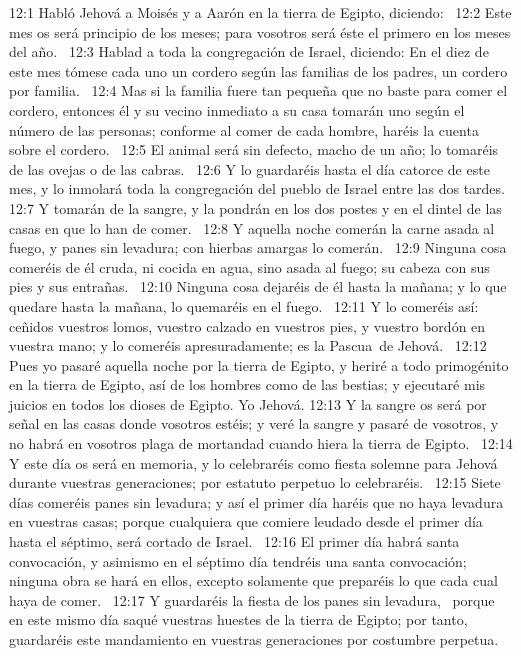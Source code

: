 12:1 Habló Jehová a Moisés y a Aarón en la tierra de Egipto, diciendo:  
12:2 Este mes os será principio de los meses; para vosotros será éste el primero en los meses del año.  
12:3 Hablad a toda la congregación de Israel, diciendo: En el diez de este mes tómese cada uno un cordero según las familias de los padres, un cordero por familia.  
12:4 Mas si la familia fuere tan pequeña que no baste para comer el cordero, entonces él y su vecino inmediato a su casa tomarán uno según el número de las personas; conforme al comer de cada hombre, haréis la cuenta sobre el cordero.  
12:5 El animal será sin defecto, macho de un año; lo tomaréis de las ovejas o de las cabras.  
12:6 Y lo guardaréis hasta el día catorce de este mes, y lo inmolará toda la congregación del pueblo de Israel entre las dos tardes.  
12:7 Y tomarán de la sangre, y la pondrán en los dos postes y en el dintel de las casas en que lo han de comer.  
12:8 Y aquella noche comerán la carne asada al fuego, y panes sin levadura; con hierbas amargas lo comerán.  
12:9 Ninguna cosa comeréis de él cruda, ni cocida en agua, sino asada al fuego; su cabeza con sus pies y sus entrañas.  
12:10 Ninguna cosa dejaréis de él hasta la mañana; y lo que quedare hasta la mañana, lo quemaréis en el fuego.  
12:11 Y lo comeréis así: ceñidos vuestros lomos, vuestro calzado en vuestros pies, y vuestro bordón en vuestra mano; y lo comeréis apresuradamente; es la Pascua de Jehová.  
12:12 Pues yo pasaré aquella noche por la tierra de Egipto, y heriré a todo primogénito en la tierra de Egipto, así de los hombres como de las bestias; y ejecutaré mis juicios en todos los dioses de Egipto. Yo Jehová. 
12:13 Y la sangre os será por señal en las casas donde vosotros estéis; y veré la sangre y pasaré de vosotros, y no habrá en vosotros plaga de mortandad cuando hiera la tierra de Egipto.  
12:14 Y este día os será en memoria, y lo celebraréis como fiesta solemne para Jehová durante vuestras generaciones; por estatuto perpetuo lo celebraréis.  
12:15 Siete días comeréis panes sin levadura; y así el primer día haréis que no haya levadura en vuestras casas; porque cualquiera que comiere leudado desde el primer día hasta el séptimo, será cortado de Israel.  
12:16 El primer día habrá santa convocación, y asimismo en el séptimo día tendréis una santa convocación; ninguna obra se hará en ellos, excepto solamente que preparéis lo que cada cual haya de comer.  
12:17 Y guardaréis la fiesta de los panes sin levadura,  porque en este mismo día saqué vuestras huestes de la tierra de Egipto; por tanto, guardaréis este mandamiento en vuestras generaciones por costumbre perpetua.  
